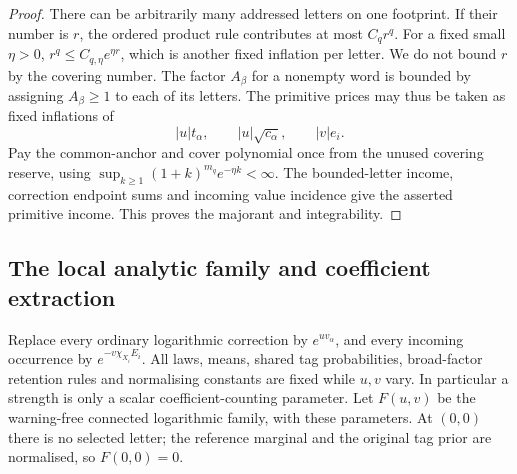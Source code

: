 \documentclass[11pt,reqno]{amsart}
\numberwithin{equation}{section}
\theoremstyle{definition}
\theoremstyle{remark}
\begin{document}
\begin{proof}
There can be arbitrarily many addressed letters on one
footprint. If their number is \(r\), the ordered product
rule contributes at most \(C_qr^q\). For a fixed small
\(\eta>0\), \(r^q\le C_{q,\eta}e^{\eta r}\), which is
another fixed inflation per letter. We do not bound \(r\)
by the covering number. The factor \(A_\beta\) for a
nonempty word is bounded by assigning \(A_\beta\ge1\)
to each of its letters. The primitive prices may thus be
taken as fixed inflations of
\[
 |u|t_\alpha,\qquad |u|\sqrt{c_\alpha},\qquad |v|e_i.
\]
Pay the common-anchor and cover polynomial once from the
unused covering reserve, using
\(\sup_{k\ge1}(1+k)^{m_q}e^{-\eta k}<\infty\).
The bounded-letter income, correction endpoint sums and
incoming value incidence give the asserted primitive
income. This proves the majorant and integrability.
\end{proof}

\subsection{The local analytic family and coefficient extraction}

Replace every ordinary logarithmic correction by
\(e^{uv_\alpha}\), and every incoming occurrence by
\(e^{-v\chi_{X_i}E_i}\). All laws, means, shared tag
probabilities, broad-factor retention rules and normalising
constants are fixed while \(u,v\) vary. In particular a
strength is only a scalar coefficient-counting parameter.
Let \(F(u,v)\) be the warning-free connected logarithmic
family, with these parameters. At \((0,0)\) there is no
selected letter; the reference marginal and the original
tag prior are normalised, so \(F(0,0)=0\).
\end{document}
